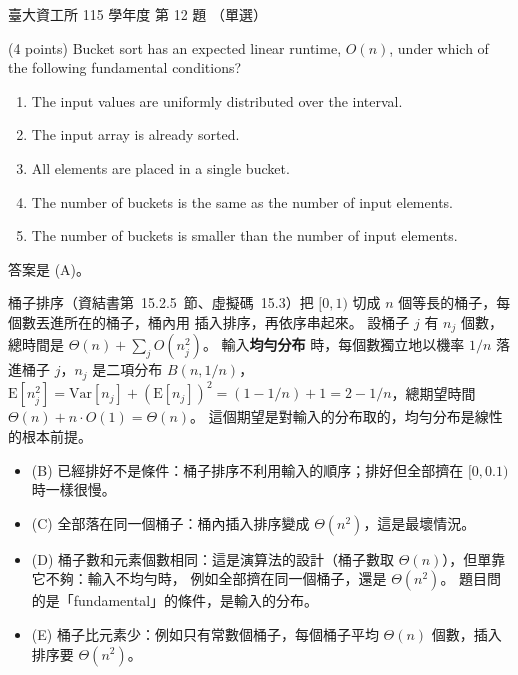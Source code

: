 \begin{pastexam}[label={px:ntu-115-dsa-12}]{臺大資工所 115 學年度 第 12 題}
（單選）

(4 points) Bucket sort has an expected linear runtime, $O(n)$, under which of the following fundamental conditions?
\begin{enumerate}[label=(\Alph*)]
\item The input values are uniformly distributed over the interval.
\item The input array is already sorted.
\item All elements are placed in a single bucket.
\item The number of buckets is the same as the number of input elements.
\item The number of buckets is smaller than the number of input elements.
\end{enumerate}
\end{pastexam}

\begin{pastsoln}
答案是 (A)。

桶子排序（資結書第~15.2.5~節、虛擬碼~15.3）把 $[0, 1)$ 切成 $n$ 個等長的桶子，每個數丟進所在的桶子，桶內用
插入排序，再依序串起來。 設桶子 $j$ 有 $n_j$ 個數，總時間是 $\Theta(n) + \sum_j O(n_j^2)$。 輸入\textbf{均勻分布}
時，每個數獨立地以機率 $1/n$ 落進桶子 $j$，$n_j$ 是二項分布 $B(n, 1/n)$，
$\mathrm{E}[n_j^2] = \mathrm{Var}[n_j] + (\mathrm{E}[n_j])^2 = (1 - 1/n) + 1 = 2 - 1/n$，總期望時間
$\Theta(n) + n \cdot O(1) = \Theta(n)$。 這個期望是對輸入的分布取的，均勻分布是線性的根本前提。
\begin{itemize}
\item (B) 已經排好不是條件：桶子排序不利用輸入的順序；排好但全部擠在 $[0, 0.1)$ 時一樣很慢。
\item (C) 全部落在同一個桶子：桶內插入排序變成 $\Theta(n^2)$，這是最壞情況。
\item (D) 桶子數和元素個數相同：這是演算法的設計（桶子數取 $\Theta(n)$），但單靠它不夠：輸入不均勻時，
例如全部擠在同一個桶子，還是 $\Theta(n^2)$。 題目問的是「fundamental」的條件，是輸入的分布。
\item (E) 桶子比元素少：例如只有常數個桶子，每個桶子平均 $\Theta(n)$ 個數，插入排序要 $\Theta(n^2)$。
\end{itemize}
\end{pastsoln}
